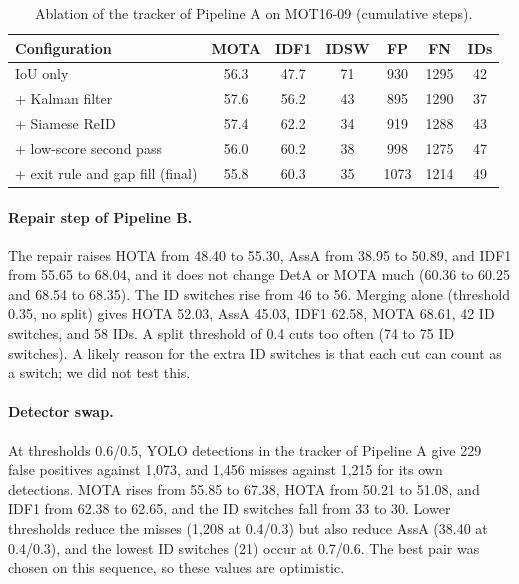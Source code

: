 \documentclass[11pt,letterpaper]{article}
\begin{document}
\begin{table}[ht]
\centering\small
\caption{Ablation of the tracker of Pipeline A on MOT16-09 (cumulative steps).}\label{tab:ablation}
\begin{tabular}{lcccccc}
\toprule
Configuration & MOTA & IDF1 & IDSW & FP & FN & IDs \\
\midrule
IoU only & 56.3 & 47.7 & 71 & 930 & 1295 & 42 \\
+ Kalman filter & 57.6 & 56.2 & 43 & 895 & 1290 & 37 \\
+ Siamese ReID & 57.4 & 62.2 & 34 & 919 & 1288 & 43 \\
+ low-score second pass & 56.0 & 60.2 & 38 & 998 & 1275 & 47 \\
+ exit rule and gap fill (final) & 55.8 & 60.3 & 35 & 1073 & 1214 & 49 \\
\bottomrule
\end{tabular}
\end{table}

\paragraph{Repair step of Pipeline B.}
The repair raises HOTA from 48.40 to 55.30, AssA from 38.95 to 50.89, and IDF1 from 55.65 to 68.04, and it does not change DetA or MOTA much (60.36 to 60.25 and 68.54 to 68.35).
The ID switches rise from 46 to 56.
Merging alone (threshold 0.35, no split) gives HOTA 52.03, AssA 45.03, IDF1 62.58, MOTA 68.61, 42 ID switches, and 58 IDs.
A split threshold of 0.4 cuts too often (74 to 75 ID switches).
A likely reason for the extra ID switches is that each cut can count as a switch; we did not test this.

\paragraph{Detector swap.}
At thresholds 0.6/0.5, YOLO detections in the tracker of Pipeline A give 229 false positives against 1,073, and 1,456 misses against 1,215 for its own detections.
MOTA rises from 55.85 to 67.38, HOTA from 50.21 to 51.08, and IDF1 from 62.38 to 62.65, and the ID switches fall from 33 to 30.
Lower thresholds reduce the misses (1,208 at 0.4/0.3) but also reduce AssA (38.40 at 0.4/0.3), and the lowest ID switches (21) occur at 0.7/0.6.
The best pair was chosen on this sequence, so these values are optimistic.
\end{document}
